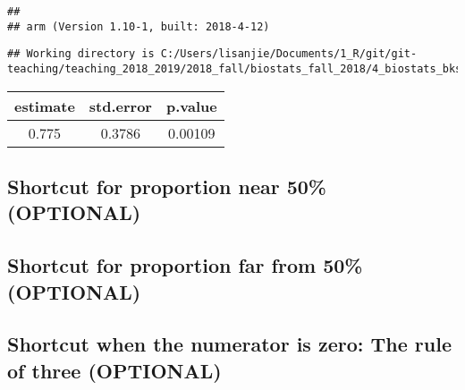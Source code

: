 \documentclass[]{book}
\theoremstyle{definition}
\theoremstyle{definition}
\theoremstyle{definition}
\theoremstyle{remark}
\begin{document}
\begin{verbatim}
## 
## arm (Version 1.10-1, built: 2018-4-12)
\end{verbatim}

\begin{verbatim}
## Working directory is C:/Users/lisanjie/Documents/1_R/git/git-teaching/teaching_2018_2019/2018_fall/biostats_fall_2018/4_biostats_bks_pkg/IBS/IBSguide
\end{verbatim}

\begin{longtable}[]{@{}ccc@{}}
\toprule
\begin{minipage}[b]{0.14\columnwidth}\centering\strut
estimate\strut
\end{minipage} & \begin{minipage}[b]{0.15\columnwidth}\centering\strut
std.error\strut
\end{minipage} & \begin{minipage}[b]{0.11\columnwidth}\centering\strut
p.value\strut
\end{minipage}\tabularnewline
\midrule
\endhead
\begin{minipage}[t]{0.14\columnwidth}\centering\strut
0.775\strut
\end{minipage} & \begin{minipage}[t]{0.15\columnwidth}\centering\strut
0.3786\strut
\end{minipage} & \begin{minipage}[t]{0.11\columnwidth}\centering\strut
0.00109\strut
\end{minipage}\tabularnewline
\bottomrule
\end{longtable}

\subsection{Shortcut for proportion near 50\%
(OPTIONAL)}\label{shortcut-for-proportion-near-50-optional}

\subsection{Shortcut for proportion far from 50\%
(OPTIONAL)}\label{shortcut-for-proportion-far-from-50-optional}

\subsection{Shortcut when the numerator is zero: The rule of three
(OPTIONAL)}\label{shortcut-when-the-numerator-is-zero-the-rule-of-three-optional}
\end{document}
